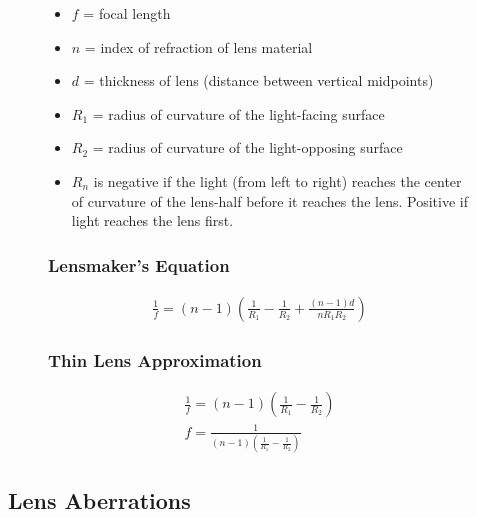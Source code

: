 \documentclass{article}
\begin{document}
\begin{figure}[ht]
    \begin{minipage}[t]{0.4\textwidth}
        \begin{itemize}
            \item $f$ = focal length
            \item $n$ = index of refraction of lens material
            \item $d$ = thickness of lens (distance between vertical midpoints)
            \item $R_1$ = radius of curvature of the light-facing surface
            \item $R_2$ = radius of curvature of the light-opposing surface
            \item $R_n$ is negative if the light (from left to right) reaches
                the center of curvature of the lens-half before it reaches the
                lens. Positive if light reaches the lens first.
        \end{itemize}
    \end{minipage}
    \hfill\vline\hfill
    \begin{minipage}[t]{0.5\textwidth}
        \subsubsection{Lensmaker's Equation}
        \begin{gather}
            \frac{1}{f} = (n - 1)\left(\frac{1}{R_1} - \frac{1}{R_2} + \frac{(n - 1)d}{nR_1R_2}\right)
        \end{gather}

        \subsubsection{Thin Lens Approximation}
        \begin{gather}
            \frac{1}{f} = (n - 1)\left(\frac{1}{R_1} - \frac{1}{R_2}\right) \\
            f = \frac{1}{(n - 1)\left(\frac{1}{R_1} - \frac{1}{R_2}\right)}
        \end{gather}
    \end{minipage}
\end{figure}

\subsection{Lens Aberrations}
\end{document}
